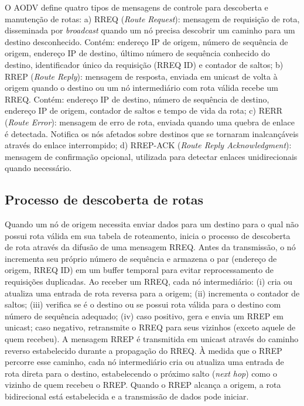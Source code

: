 O AODV define quatro tipos de mensagens de controle para descoberta e
manutenção de rotas: a) RREQ (\emph{Route Request}): mensagem de
requisição de rota, disseminada por \emph{broadcast} quando um nó
precisa descobrir um caminho para um destino desconhecido. Contém:
endereço IP de origem, número de sequência de origem, endereço IP de
destino, último número de sequência conhecido do destino, identificador
único da requisição (RREQ ID) e contador de saltos; b) RREP (\emph{Route
Reply}): mensagem de resposta, enviada em unicast de volta à origem
quando o destino ou um nó intermediário com rota válida recebe um RREQ.
Contém: endereço IP de destino, número de sequência de destino, endereço
IP de origem, contador de saltos e tempo de vida da rota; c) RERR
(\emph{Route Error}): mensagem de erro de rota, enviada quando uma
quebra de enlace é detectada. Notifica os nós afetados sobre destinos
que se tornaram inalcançáveis através do enlace interrompido; d)
RREP-ACK (\emph{Route Reply Acknowledgment}): mensagem de confirmação
opcional, utilizada para detectar enlaces unidirecionais quando
necessário.

\subsection{Processo de descoberta de
rotas}\label{processo-de-descoberta-de-rotas}

Quando um nó de origem necessita enviar dados para um destino para o
qual não possui rota válida em sua tabela de roteamento, inicia o
processo de descoberta de rota através da difusão de uma mensagem RREQ.
Antes da transmissão, o nó incrementa seu próprio número de sequência e
armazena o par (endereço de origem, RREQ ID) em um buffer temporal para
evitar reprocessamento de requisições duplicadas. Ao receber um RREQ,
cada nó intermediário: (i) cria ou atualiza uma entrada de rota reversa
para a origem; (ii) incrementa o contador de saltos; (iii) verifica se é
o destino ou se possui rota válida para o destino com número de
sequência adequado; (iv) caso positivo, gera e envia um RREP em unicast;
caso negativo, retransmite o RREQ para seus vizinhos (exceto aquele de
quem recebeu). A mensagem RREP é transmitida em unicast através do
caminho reverso estabelecido durante a propagação do RREQ. À medida que
o RREP percorre esse caminho, cada nó intermediário cria ou atualiza uma
entrada de rota direta para o destino, estabelecendo o próximo salto
(\emph{next hop}) como o vizinho de quem recebeu o RREP. Quando o RREP
alcança a origem, a rota bidirecional está estabelecida e a transmissão
de dados pode iniciar.

